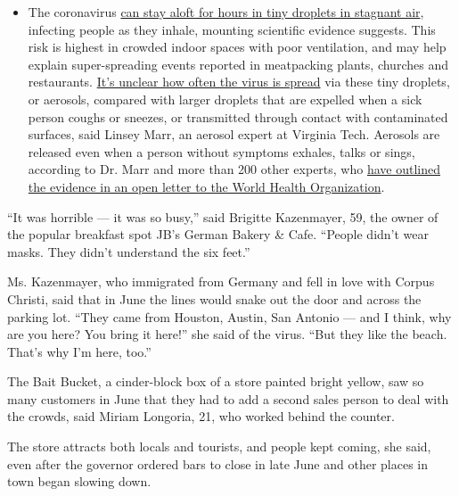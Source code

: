 \begin{itemize}
  \begin{itemize}
  \tightlist
  \item
    The coronavirus
    \href{https://www.nytimes.com/2020/07/04/health/239-experts-with-one-big-claim-the-coronavirus-is-airborne.html?action=click\&pgtype=Article\&state=default\&region=MAIN_CONTENT_3\&context=storylines_faq}{can
    stay aloft for hours in tiny droplets in stagnant air}, infecting
    people as they inhale, mounting scientific evidence suggests. This
    risk is highest in crowded indoor spaces with poor ventilation, and
    may help explain super-spreading events reported in meatpacking
    plants, churches and restaurants.
    \href{https://www.nytimes.com/2020/07/06/health/coronavirus-airborne-aerosols.html?action=click\&pgtype=Article\&state=default\&region=MAIN_CONTENT_3\&context=storylines_faq}{It's
    unclear how often the virus is spread} via these tiny droplets, or
    aerosols, compared with larger droplets that are expelled when a
    sick person coughs or sneezes, or transmitted through contact with
    contaminated surfaces, said Linsey Marr, an aerosol expert at
    Virginia Tech. Aerosols are released even when a person without
    symptoms exhales, talks or sings, according to Dr. Marr and more
    than 200 other experts, who
    \href{https://academic.oup.com/cid/article/doi/10.1093/cid/ciaa939/5867798}{have
    outlined the evidence in an open letter to the World Health
    Organization}.
  \end{itemize}
\end{itemize}

``It was horrible --- it was so busy,'' said Brigitte Kazenmayer, 59,
the owner of the popular breakfast spot JB's German Bakery \& Cafe.
``People didn't wear masks. They didn't understand the six feet.''

Ms. Kazenmayer, who immigrated from Germany and fell in love with Corpus
Christi, said that in June the lines would snake out the door and across
the parking lot. ``They came from Houston, Austin, San Antonio --- and I
think, why are you here? You bring it here!'' she said of the virus.
``But they like the beach. That's why I'm here, too.''

The Bait Bucket, a cinder-block box of a store painted bright yellow,
saw so many customers in June that they had to add a second sales person
to deal with the crowds, said Miriam Longoria, 21, who worked behind the
counter.

The store attracts both locals and tourists, and people kept coming, she
said, even after the governor ordered bars to close in late June and
other places in town began slowing down.

